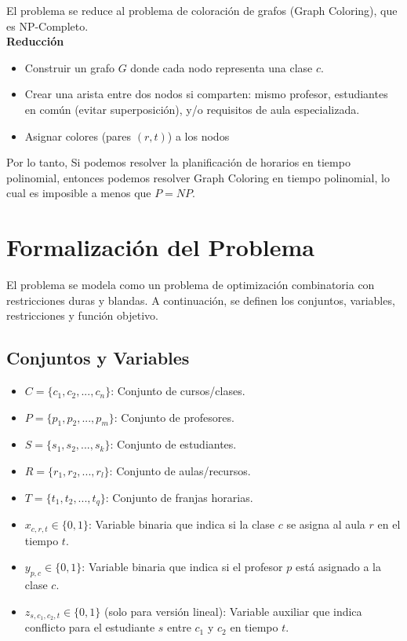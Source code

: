 \documentclass[12pt, a4paper]{article}
\begin{document}
El problema se reduce al problema de coloración de grafos (Graph Coloring), que es NP-Completo.\\
\textbf{Reducción}
\begin{itemize}
    \item Construir un grafo $G$ donde cada nodo representa una clase $c$.
    \item Crear una arista entre dos nodos si comparten: mismo profesor, estudiantes en común (evitar superposición), y/o requisitos de aula especializada.
    \item Asignar colores (pares $(r,t)$) a los nodos
\end{itemize}
Por lo tanto, Si podemos resolver la planificación de horarios en tiempo polinomial, entonces podemos resolver Graph Coloring en tiempo polinomial, lo cual es imposible a menos que $P = NP$.

\section{Formalización del Problema}
El problema se modela como un problema de optimización combinatoria con restricciones duras y blandas. A continuación, se definen los conjuntos, variables, restricciones y función objetivo.

\subsection{Conjuntos y Variables}
\begin{itemize}
    \item \( C = \{c_1, c_2, ..., c_n\} \): Conjunto de cursos/clases.
    \item \( P = \{p_1, p_2, ..., p_m\} \): Conjunto de profesores.
    \item \( S = \{s_1, s_2, ..., s_k\} \): Conjunto de estudiantes.
    \item \( R = \{r_1, r_2, ..., r_l\} \): Conjunto de aulas/recursos.
    \item \( T = \{t_1, t_2, ..., t_q\} \): Conjunto de franjas horarias.
    \item \( x_{c, r, t} \in \{0, 1\} \): Variable binaria que indica si la clase \( c \) se asigna al aula \( r \) en el tiempo \( t \).
    \item \( y_{p, c} \in \{0, 1\} \): Variable binaria que indica si el profesor \( p \) está asignado a la clase \( c \).
    \item \( z_{s, c_1, c_2, t} \in \{0, 1\} \) (solo para versión lineal): Variable auxiliar que indica conflicto para el estudiante \( s \) entre \( c_1 \) y \( c_2 \) en tiempo \( t \).
\end{itemize}
\end{document}

